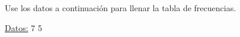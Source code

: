 \documentclass{cdplf-prueba}
\begin{document}
\subsection{}

Use los datos a continuación para llenar la tabla de frecuencias.

\underline{Datos:} \hspace{4pt} 7 \hspace{4pt}\textbullet\hspace{4pt} 5 \hspace{4pt}\textbullet
\end{document}
